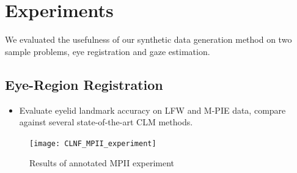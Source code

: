 
\section{Experiments}

We evaluated the usefulness of our synthetic data generation method on two sample problems, eye registration and gaze estimation.


\subsection{Eye-Region Registration}


\begin{itemize}
    \item Evaluate eyelid landmark accuracy on LFW and M-PIE data, compare against several state-of-the-art CLM methods.
\end{itemize}

\begin{figure}
    \centering
    \texttt{[image: CLNF\_MPII\_experiment]}
    \caption{Results of annotated MPII experiment}
    \label{fig:eye_model}
\end{figure}

